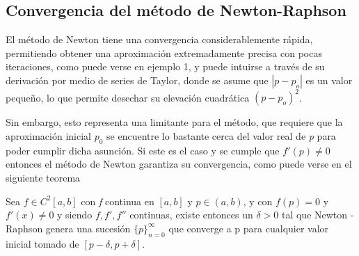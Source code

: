 \subsection{Convergencia del método de Newton-Raphson}

El método de Newton tiene una convergencia considerablemente rápida, permitiendo obtener una aproximación extremadamente precisa con pocas iteraciones, como puede verse en ejemplo 1, y puede intuirse a través de su derivación por medio de series de Taylor, donde se asume que $ | p - p_o | $ es un valor pequeño, lo que permite desechar su elevación cuadrática $(p-p_o)^2$.

Sin embargo, esto representa una limitante para el método, que requiere que la aproximación inicial $p_0$ se encuentre lo bastante cerca del valor real de \textit{p} para poder cumplir dicha asunción. Si este es el caso y se cumple que $f'(p) \neq 0$ entonces el método de Newton garantiza su convergencia, como puede verse en el siguiente teorema

\begin{theorem}
Sea $f \in C^2[a,b]$ con \textit{f} continua en $[a,b]$ y $p \in (a,b)$, y con $f(p) = 0$ y $f'(x) \neq 0$ y siendo $f,f', f''$ continuas, existe entonces un $\delta > 0$  tal que Newton - Raphson genera una sucesión $\{p\}^\infty_{n=0}$ que converge a p para cualquier valor inicial tomado de $[p-\delta, p+\delta]$.
\end{theorem}

